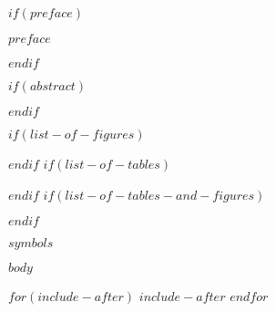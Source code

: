 \documentclass[master=$master$,masteroption=$masteroption$, $language$]{$documentclass$}
\begin{document}
$if(preface)$
\begin{preface}
  $preface$
\end{preface}
$endif$

\tableofcontents*

$if(abstract)$
\begin{abstract}
  $abstract$
\end{abstract}
$endif$

$if(list-of-figures)$
\listoffigures
$endif$
$if(list-of-tables)$
\listoftables
$endif$
$if(list-of-tables-and-figures)$
\listoftables
$endif$

$symbols$

\mainmatter

$body$

\backmatter




$for(include-after)$
$include-after$
$endfor$
\end{document}
